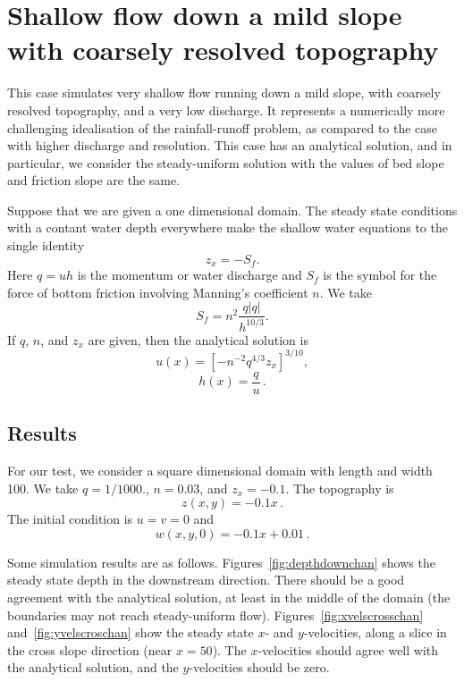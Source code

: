 

\section{Shallow flow down a mild slope with coarsely resolved topography}
This case simulates very shallow flow running down a mild slope, with coarsely resolved topography, and a very low discharge. It represents a numerically more challenging idealisation of the rainfall-runoff problem, as compared to the case with higher discharge and resolution. This case has an analytical solution, and in particular, we consider the steady-uniform solution with the values of bed slope and friction slope are the same.   

Suppose that we are given a one dimensional domain. The steady state conditions with a contant water depth everywhere make the shallow water equations to the single identity
\begin{equation}
z_x = - S_f.
\end{equation}
Here $q=uh$ is the momentum or water discharge and $S_f$ is the symbol for the force of bottom friction involving Manning's coefficient $n$. We take 
\begin{equation}
S_f = n^2 \frac{q|q|}{h^{10/3}}.
\end{equation}
If $q$, $n$, and $z_x$ are given, then the analytical solution is
\begin{equation}
u(x)= \left[- n^{-2} q^{4/3} z_x\right]^{3/10},
\end{equation}
\begin{equation}
h(x)= \frac{q}{u}\,.
\end{equation}

\subsection{Results}
For our test, we consider a square dimensional domain with length and width 100. We take $q=1/1000.$, $n=0.03$, and $z_x=-0.1$.
The topography is
\begin{equation}
z(x, y)= -0.1 x\,.
\end{equation}
The initial condition is $u=v=0$ and
\begin{equation}
w(x,y,0)= -0.1 x + 0.01\,.
\end{equation}


Some simulation results are as follows.
Figures~\ref{fig:depthdownchan} shows the steady state depth in the downstream direction. There should be a good agreement with the analytical solution, at least in the middle of the domain (the boundaries may not reach steady-uniform flow). 
Figures~\ref{fig:xvelscrosschan} and~\ref{fig:yvelscroschan} show the steady state $x$- and $y$-velocities, along a slice in the cross slope direction (near $x=50$). The $x$-velocities should agree well with the analytical solution, and the $y$-velocities should be zero. 

